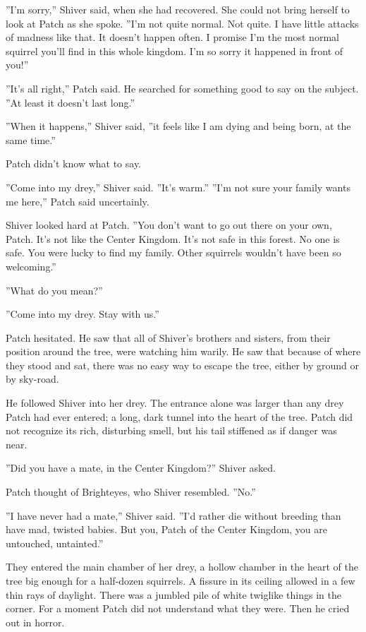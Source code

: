 \documentclass[12pt]{book}
\begin{document}
 ''I'm sorry,'' Shiver said, when she had recovered. She could not bring herself to look at Patch as she spoke. ''I'm not quite normal. Not quite. I have little attacks of madness like that. It doesn't happen often. I promise I'm the most normal squirrel you'll find in this whole kingdom. I'm so sorry it happened in front of you!''\par
 ''It's all right,'' Patch said. He searched for something good to say on the subject. ''At least it doesn't last long.''\par
 ''When it happens,'' Shiver said, ''it feels like I am dying and being born, at the same time.''\par
 Patch didn't know what to say.\par
 ''Come into my drey,'' Shiver said. ''It's warm.'' ''I'm not sure your family wants me here,'' Patch said uncertainly.\par
 Shiver looked hard at Patch. ''You don't want to go out there on your own, Patch. It's not like the Center Kingdom. It's not safe in this forest. No one is safe. You were lucky to find my family. Other squirrels wouldn't have been so welcoming.''\par
 ''What do you mean?''\par
 ''Come into my drey. Stay with us.''\par
 Patch hesitated. He saw that all of Shiver's brothers and sisters, from their position around the tree, were watching him warily. He saw that because of where they stood and sat, there was no easy way to escape the tree, either by ground or by sky-road.\par
He followed Shiver into her drey. The entrance alone was larger than any drey Patch had ever entered; a long, dark tunnel into the heart of the tree. Patch did not recognize its rich, disturbing smell, but his tail stiffened as if danger was near.\par
 ''Did you have a mate, in the Center Kingdom?'' Shiver asked.\par
 Patch thought of Brighteyes, who Shiver resembled. ''No.''\par
 ''I have never had a mate,'' Shiver said. ''I'd rather die without breeding than have mad, twisted babies. But you, Patch of the Center Kingdom, you are untouched, untainted.''\par
They entered the main chamber of her drey, a hollow chamber in the heart of the tree big enough for a half-dozen squirrels. A fissure in its ceiling allowed in a few thin rays of daylight. There was a jumbled pile of white twiglike things in the corner. For a moment Patch did not understand what they were. Then he cried out in horror.\par
\end{document}
